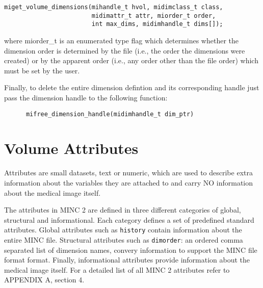 \documentclass{article}
\begin{document}
\begin{verbatim}
miget_volume_dimensions(mihandle_t hvol, midimclass_t class,
                        midimattr_t attr, miorder_t order,
                        int max_dims, midimhandle_t dims[]);
\end{verbatim}
   
where miorder\_t is an enumerated type flag which determines whether the
dimension order is determined by the file (i.e., the order the dimensions
were created) or by the apparent order (i.e., any order other than the file
order) which must be set by the user.       
     
Finally, to delete the entire dimension defintion and its corresponding handle
just pass the dimension handle to the following function:\\
\begin{verbatim}
      mifree_dimension_handle(midimhandle_t dim_ptr)
\end{verbatim}

\section{Volume Attributes}
Attributes are small datasets, text or numeric, which are used to describe extra information about 
the variables they are attached to and carry NO information about the medical image itself.

The attributes in MINC 2 are defined in three different categories of
global, structural and informational. Each category defines a set of predefined standard 
attributes. Global attributes such as 
{\tt history} contain information about the entire MINC file. Structural attributes such 
as {\tt dimorder}: an ordered comma separated list of dimension names, 
convery information to support the MINC file format format. Finally, informational attributes
provide information about the medical image itself. For a detailed list of
all MINC 2 attributes refer to APPENDIX A, section 4.
 
\end{document}
